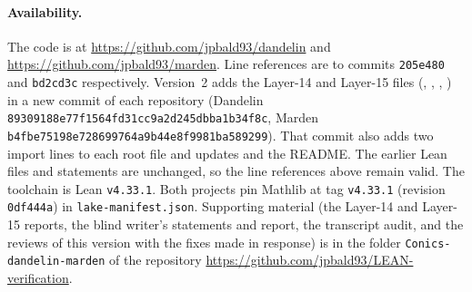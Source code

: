 \documentclass[11pt]{article}
\theoremstyle{remark}
\newcommand{\repoD}{https://github.com/jpbald93/dandelin}
\newcommand{\repoM}{https://github.com/jpbald93/marden}
\begin{document}
\paragraph{Availability.}
The code is at \url{\repoD} and \url{\repoM}. Line references are to commits
\texttt{205e480} and \texttt{bd2cd3c} respectively.
Version~2 adds the Layer-14 and Layer-15 files (,
, , ) in a
new commit of each repository (Dandelin \texttt{89309188e77f1564fd31cc9a2d245dbba1b34f8c}, Marden \texttt{b4fbe75198e728699764a9b44e8f9981ba589299}). That commit
also adds two import lines to each root file and updates  and the README. The
earlier Lean files and statements are unchanged, so the line references above remain valid.
The toolchain is Lean \texttt{v4.33.1}. Both projects pin Mathlib at tag \texttt{v4.33.1}
(revision \texttt{0df444a}) in \texttt{lake-manifest.json}.
Supporting material (the Layer-14 and Layer-15 reports, the blind writer's statements and report, the transcript audit, and the reviews of this version with the fixes made in response) is in the folder \texttt{Conics-dandelin-marden} of the repository \url{https://github.com/jpbald93/LEAN-verification}.
\end{document}
